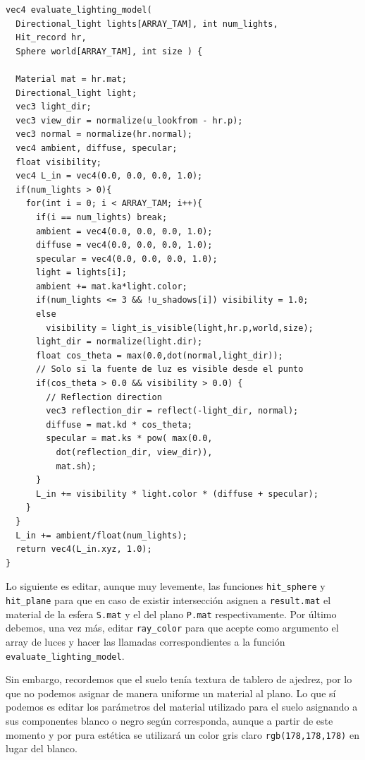 \begin{lstlisting}
vec4 evaluate_lighting_model( 
  Directional_light lights[ARRAY_TAM], int num_lights, 
  Hit_record hr,
  Sphere world[ARRAY_TAM], int size ) {
  
  Material mat = hr.mat;
  Directional_light light;
  vec3 light_dir;
  vec3 view_dir = normalize(u_lookfrom - hr.p);
  vec3 normal = normalize(hr.normal);
  vec4 ambient, diffuse, specular;
  float visibility;
  vec4 L_in = vec4(0.0, 0.0, 0.0, 1.0);
  if(num_lights > 0){
    for(int i = 0; i < ARRAY_TAM; i++){
      if(i == num_lights) break;
      ambient = vec4(0.0, 0.0, 0.0, 1.0);
      diffuse = vec4(0.0, 0.0, 0.0, 1.0);
      specular = vec4(0.0, 0.0, 0.0, 1.0);
      light = lights[i];
      ambient += mat.ka*light.color;
      if(num_lights <= 3 && !u_shadows[i]) visibility = 1.0;
      else 
        visibility = light_is_visible(light,hr.p,world,size);
      light_dir = normalize(light.dir);
      float cos_theta = max(0.0,dot(normal,light_dir));
      // Solo si la fuente de luz es visible desde el punto
      if(cos_theta > 0.0 && visibility > 0.0) {
        // Reflection direction
        vec3 reflection_dir = reflect(-light_dir, normal);
        diffuse = mat.kd * cos_theta;
        specular = mat.ks * pow( max(0.0, 
          dot(reflection_dir, view_dir)), 
          mat.sh);
      }
      L_in += visibility * light.color * (diffuse + specular);
    }
  }
  L_in += ambient/float(num_lights);
  return vec4(L_in.xyz, 1.0);
}
\end{lstlisting}

Lo siguiente es editar, aunque muy levemente, las funciones \verb|hit_sphere| y \verb|hit_plane| para que en caso de existir intersección asignen a \verb|result.mat| el material de la esfera \verb|S.mat| y el del plano \verb|P.mat| respectivamente. Por último debemos, una vez más, editar \verb|ray_color| para que acepte como argumento el array de luces y hacer las llamadas correspondientes a la función \verb|evaluate_lighting_model|.

Sin embargo, recordemos que el suelo tenía textura de tablero de ajedrez, por lo que no podemos asignar de manera uniforme un material al plano. Lo que sí podemos es editar los parámetros del material utilizado para el suelo asignando a sus componentes blanco o negro según corresponda, aunque a partir de este momento y por pura estética se utilizará un color gris claro \verb|rgb(178,178,178)| en lugar del blanco.

